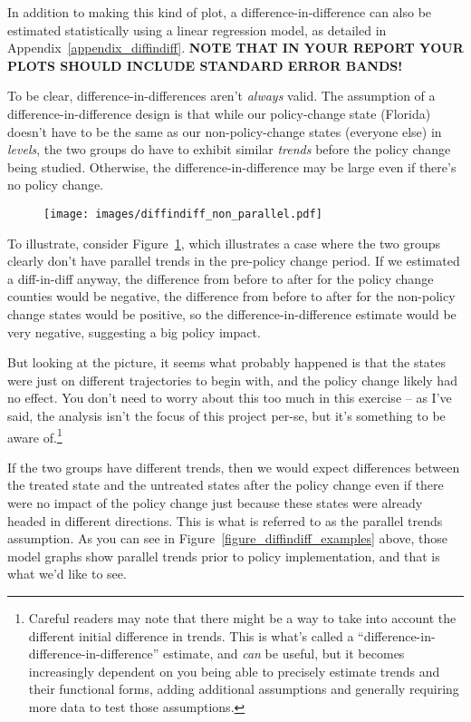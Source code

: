 \documentclass[12pt]{article}
\begin{document}
In addition to making this kind of plot, a difference-in-difference can also be estimated statistically using a linear regression model, as detailed in Appendix~\ref{appendix_diffindiff}. \textbf{NOTE THAT IN YOUR REPORT YOUR PLOTS SHOULD INCLUDE STANDARD ERROR BANDS!}

To be clear, difference-in-differences aren't \emph{always} valid. The assumption of a difference-in-difference design is that while our policy-change state (Florida) doesn't have to be the same as our non-policy-change states (everyone else) in \emph{levels}, the two groups do have to exhibit similar \emph{trends} before the policy change being studied. Otherwise, the difference-in-difference may be large even if there's no policy change.

\begin{figure}[h!]
  \centering
  \caption{}\label{figure_diffindiff_nonparallel}
  \texttt{[image: images/diffindiff\_non\_parallel.pdf]}
\end{figure}


To illustrate, consider Figure~\ref{figure_diffindiff_nonparallel}, which illustrates a case where the two groups clearly don't have parallel trends in the pre-policy change period. If we estimated a diff-in-diff anyway, the difference from before to after for the policy change counties would be negative, the difference from before to after for the non-policy change states would be positive, so the difference-in-difference estimate would be very negative, suggesting a big policy impact.

But looking at the picture, it seems what probably happened is that the states were just on different trajectories to begin with, and the policy change likely had no effect. You don't need to worry about this too much in this exercise -- as I've said, the analysis isn't the focus of this project per-se, but it's something to be aware of.\footnote{Careful readers may note that there might be a way to take into account the different initial difference in trends. This is what's called a ``difference-in-difference-in-difference'' estimate, and \emph{can} be useful, but it becomes increasingly dependent on you being able to precisely estimate trends and their functional forms, adding additional assumptions and generally requiring more data to test those assumptions.}



If the two groups have different trends, then we would expect differences between the treated state and the untreated states after the policy change even if there were no impact of the policy change just because these states were already headed in different directions.  This is what is referred to as the parallel trends assumption. As you can see in Figure~\ref{figure_diffindiff_examples} above, those model graphs show parallel trends prior to policy implementation, and that is what we'd like to see.
\end{document}

